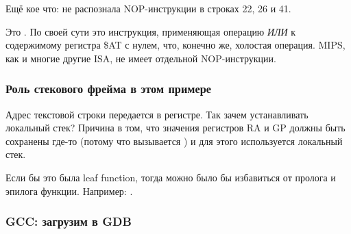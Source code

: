 Ещё кое что: \IDA не распознала \ac{NOP}-инструкции в строках 22, 26 и 41.

Это .
По своей сути это инструкция, применяющая операцию \emph{ИЛИ} к содержимому регистра \$AT с нулем,
что, конечно же, холостая операция.
MIPS, как и многие другие \ac{ISA}, не имеет отдельной \ac{NOP}-инструкции.

\subsubsection{Роль стекового фрейма в этом примере}

Адрес текстовой строки передается в регистре.
Так зачем устанавливать локальный стек?
Причина в том, что значения регистров \ac{RA} и GP должны быть сохранены где-то
(потому что вызывается \printf) и для этого используется локальный стек.

Если бы это была \gls{leaf function}, тогда можно было бы избавиться от пролога и эпилога функции. Например:
 .

\subsubsection{\Optimizing GCC: загрузим в GDB}



